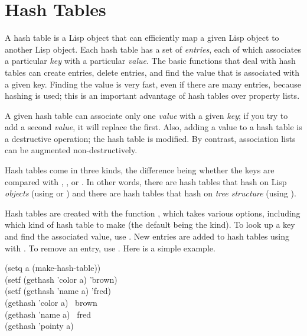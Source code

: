 
\clearpage\def\pagestatus{FINAL PROOF}

\chapter{Hash Tables}
\label{HASH}

A hash table is a Lisp object that can efficiently map a given
Lisp object to another Lisp object.
Each hash table has a set of {\it entries}, each of which associates a
particular {\it key} with a particular {\it value}.  The basic functions
that deal with hash tables can create entries, delete entries, and find
the value that is associated with a given key.  Finding the value is
very fast, even if there are many entries, because hashing is used; this
is an important advantage of hash tables over property lists.

A given hash table can associate only one {\it value} with a given
{\it key}; if you try to add a second {\it value}, it will replace the
first.  Also, adding a value to a hash table is a destructive operation;
the hash table is modified.  By contrast, association lists can be
augmented non-destructively.

Hash tables come in three kinds, the difference being whether the keys
are compared with , , or .  In other words, there
are hash tables that hash on Lisp {\it objects} (using  or )
and there are hash tables that hash on {\it tree structure}
(using ).

Hash tables are created with the function
, which takes various options, including
which kind of hash table to make (the default being the  kind).
To look up a key and find
the associated value, use .
New entries are added
to hash tables using  with .
To remove an entry, use .  Here is a simple example.
\begin{lisp}
(setq a (make-hash-table)) \\
(setf (gethash 'color a) 'brown) \\
(setf (gethash 'name a) 'fred) \\
(gethash 'color a) \EV\ brown \\
(gethash 'name a) \EV\ fred \\
(gethash 'pointy a) \EV\ {\false}
\end{lisp}

